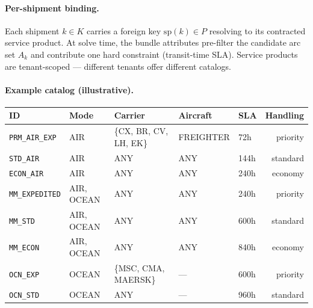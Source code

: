 \documentclass[11pt,a4paper]{article}
\theoremstyle{definition}
\begin{document}
\paragraph{Per-shipment binding.}
Each shipment $k \in K$ carries a foreign key $\text{sp}(k) \in P$ resolving to its
contracted service product. At solve time, the bundle attributes pre-filter the
candidate arc set $A_k$ and contribute one hard constraint (transit-time SLA).
Service products are tenant-scoped --- different tenants offer different catalogs.

\paragraph{Example catalog (illustrative).}
\begin{center}
\begin{tabular}{lllllr}
\toprule
ID & Mode & Carrier & Aircraft & SLA & Handling \\
\midrule
\texttt{PRM\_AIR\_EXP} & AIR & \{CX, BR, CV, LH, EK\} & FREIGHTER & 72h & priority \\
\texttt{STD\_AIR} & AIR & ANY & ANY & 144h & standard \\
\texttt{ECON\_AIR} & AIR & ANY & ANY & 240h & economy \\
\texttt{MM\_EXPEDITED} & AIR, OCEAN & ANY & ANY & 240h & priority \\
\texttt{MM\_STD} & AIR, OCEAN & ANY & ANY & 600h & standard \\
\texttt{MM\_ECON} & AIR, OCEAN & ANY & ANY & 840h & economy \\
\texttt{OCN\_EXP} & OCEAN & \{MSC, CMA, MAERSK\} & --- & 600h & priority \\
\texttt{OCN\_STD} & OCEAN & ANY & --- & 960h & standard \\
\bottomrule
\end{tabular}
\end{center}
\end{document}
